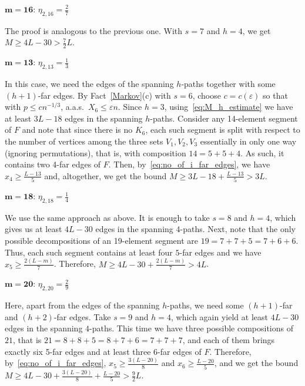 \documentclass[reqno, 12pt]{amsart}
\numberwithin{equation}{section}
\numberwithin{figure}{section}
\let\epsilon=\varepsilon
\let\eps=\epsilon
\theoremstyle{plain}
\theoremstyle{definition}
\begin{document}
\medskip
	
$\mathbf{m=16}$: $\eta_{2,16}= \frac27$

\medskip
The proof is analogous to the previous one. With $s=7$ and $h=4$, we get $M\ge 4L-30>\frac72L$.

\medskip

$\mathbf{m=13}$: $\eta_{2,13}= \frac13$

\medskip

In this case, we need the edges of the spanning $h$-paths together with some $(h+1)$-far edges.
By Fact~\ref{Markov}(c) with $s=6$, choose $c = c(\eps)$ so that with $p\leq cn^{-1/3}$, a.a.s.~$X_6 \leq \eps n$. Since $h = 3$, using~\eqref{eq:M_h_estimate} we have at least $3L - 18$ edges in the spanning $h$-paths.
Consider any 14-element segment of $F$ and note that since there is no $K_6$, each such segment is split with respect to the number of vertices among the three sets $V_1,V_2,V_3$ essentially in only one way (ignoring permutations), that is, with composition $14=5+5+4$. As such, it contains two 4-far edges of $F$. Then, by~\eqref{eq:no_of_i_far_edges}, we have $x_4 \geq \frac{L-13}{5}$ and, altogether, we get the bound $M\ge 3L-18+\frac{L-13}{5}>3L$.

\medskip

$\mathbf{m=18}$: $\eta_{2,18}=\frac14$

\medskip

We use the same approach as above. It is enough to take $s=8$ and $h=4$, which gives us at least $4L-30$ edges in the spanning $4$-paths. Next, note that the only possible decompositions of an 19-element segment are $19=7+7+5=7+6+6$. Thus, each such segment contains at least four $5$-far edges and we have $x_5 \geq \frac{2(L-m)}{7}$. Therefore, $M \geq 4L-30+\frac{2(L-m)}{7} > 4L$.

\medskip
	
$\mathbf{m=20}$: $\eta_{2,20}=\frac29$

\medskip

Here, apart from the edges of the spanning $h$-paths, we need some $(h+1)$-far and $(h+2)$-far edges. Take $s=9$ and $h=4$, which again yield at least $4L-30$ edges in the spanning $4$-paths. This time we have three possible compositions of $21$, that is $21=8+8+5=8+7+6=7+7+7$, and each of them brings exactly six 5-far edges and at least three 6-far edges of $F$. Therefore, by~\eqref{eq:no_of_i_far_edges}, $x_5 \geq \frac{3(L-20)}{8}$ and $x_6 \geq \frac{L-20}{5}$, and we get the bound $M \geq 4L-30 + \frac{3(L-20)}{8} + \frac{L-20}{5} > \frac92L$.
\end{document}
